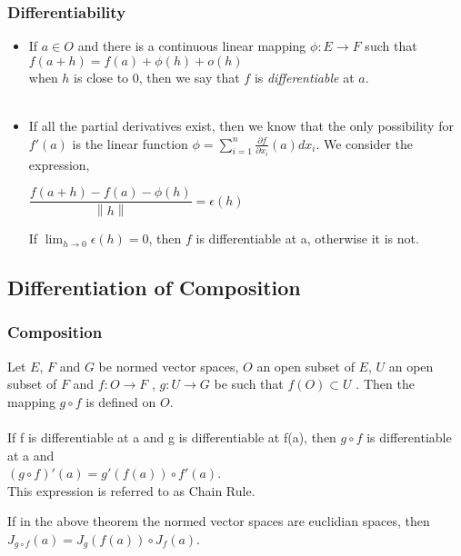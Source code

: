 \documentclass{beamer}
\newcommand\norm[1]{\left\lVert#1\right\rVert}
\begin{document}
\begin{frame}
\frametitle{Differentiability}
\begin{itemize}
\item If $a \in O$ and there is a continuous linear mapping $\phi : E \rightarrow F$ such that \\
\hspace*{1cm} $ f(a+h) = f(a) + \phi (h) + o(h) $ \\
when $h$ is close to 0, then we say that $f$ is \textit{differentiable} at $a$.\\~\\
\pause

\item If all the partial derivatives exist, then we know that the only possibility for $f'(a)$ is the linear function $ \phi = \sum_{i=1}^{n} \frac{\partial f}{\partial x_i} (a) dx_i $. We consider the expression,\\

\begin{center}

$ \dfrac{f(a+h) - f(a) - \phi (h)}{\norm{h}} = \epsilon (h)$
\end{center}

If $\lim_{h \to 0} \epsilon (h) =  0$, then $f$ is differentiable at a, otherwise it is not. \\

\end{itemize}
\end{frame}


\subsection{Differentiation of Composition}

\begin{frame} %
\frametitle{Composition}
Let $E$, $F$ and $G$ be normed vector spaces, $O$ an open subset of $E$, $U$ an open subset of $F$ and $f : O \rightarrow F$ , $g : U \rightarrow G$ be such that $f(O) \subset U$ . Then the mapping $g \circ f$ is defined on $O$.\\~\\

If f is differentiable at a and g is differentiable at f(a), then $g \circ f$ is differentiable at a and\\
\hspace*{4cm} $  (g \circ f)' (a) = g'(f(a))\circ f'(a) $.\\
This expression is referred to as Chain Rule.
\pause

If in the above theorem the normed vector spaces are euclidian
spaces, then \\
\hspace*{4cm} $ J_{g \circ f} (a) = J_g (f(a)) \circ J_f (a)$.

\end{frame}
\end{document}
